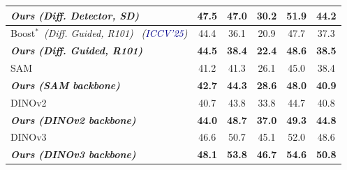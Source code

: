 \begin{table}[ht]
{\begin{tabular}{l|cccc|>{\columncolor{gray!20}}c}
    \textit{\textbf{Ours (Diff. Detector, SD)}} & \textbf{47.5} & \textbf{47.0} & \textbf{30.2} & \textbf{51.9} & \textbf{44.2} \\
    \midrule
    Boost$^{*}$~\footnotesize{\textit{(Diff. Guided, R101)}}~\cite{he2025boosting} \textit{\scriptsize{(\textcolor{darkblue}{ICCV'25})}} &44.4 & 36.1 & 20.9 & 47.7 & 37.3 \\
    \rowcolor{lightgreen}
    \textit{\textbf{Ours (Diff. Guided, R101)}} &\textbf{44.5} & \textbf{38.4} &\textbf{22.4} & \textbf{48.6} & \textbf{38.5} \\
    \midrule
    SAM & 41.2 & 41.3 & 26.1 & 45.0 & 38.4 \\
    \rowcolor{lightgreen}
    \textit{\textbf{Ours (SAM backbone)}} & \textbf{42.7} & \textbf{44.3} & \textbf{28.6} & \textbf{48.0} & \textbf{40.9} \\
    \midrule
    DINOv2 & 40.7 & 43.8 & 33.8 & 44.7 & 40.8 \\
    \rowcolor{lightgreen}
    \textit{\textbf{Ours (DINOv2 backbone)}} & \textbf{44.0} & \textbf{48.7} & \textbf{37.0} & \textbf{49.3} & \textbf{44.8} \\
    \midrule
    DINOv3 & 46.6 & 50.7 & 45.1 & 52.0 & 48.6 \\
    \rowcolor{lightgreen}
    \textit{\textbf{Ours (DINOv3 backbone)}} & \textbf{48.1} & \textbf{53.8} & \textbf{46.7} & \textbf{54.6} & \textbf{50.8} \\
    \bottomrule
    \end{tabular}}




\end{table}
